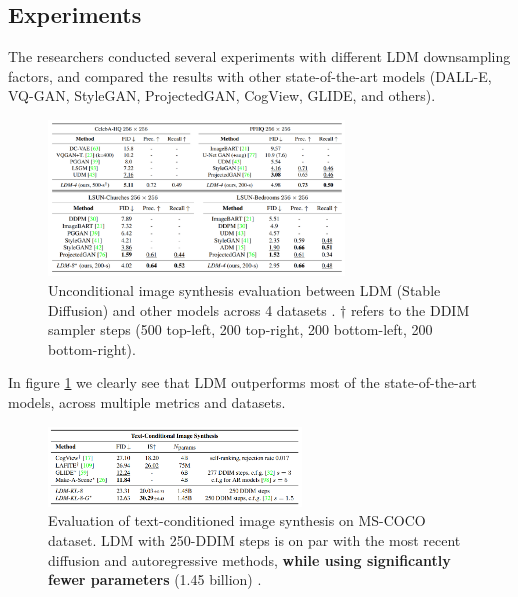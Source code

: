 \subsection{Experiments}

The researchers conducted several experiments with different LDM downsampling factors, and compared the results with other state-of-the-art models (DALL-E, VQ-GAN, StyleGAN, ProjectedGAN, CogView, GLIDE, and others).

\begin{figure}
    \centering
    \includegraphics[width=0.7\textwidth]{images/diffusion_models/stable_diffusion/experiments_1.png}
    \caption{Unconditional image synthesis evaluation between LDM (Stable Diffusion) and other models across 4 datasets \cite{stable_diffusion}. $\dagger$ refers to the DDIM sampler steps (500 top-left, 200 top-right, 200 bottom-left, 200 bottom-right).}
    \label{fig:stable_diffusion_experiments_unconditional}
\end{figure}

In figure \ref{fig:stable_diffusion_experiments_unconditional} we clearly see that LDM outperforms most of the state-of-the-art models, across multiple metrics and datasets.

\begin{figure}
    \centering
    \includegraphics[width=0.6\textwidth]{images/diffusion_models/stable_diffusion/experiments_2.png}
    \caption{Evaluation of text-conditioned image synthesis on MS-COCO dataset. LDM with 250-DDIM steps is on par with the most recent diffusion and autoregressive methods, \textbf{while using significantly fewer parameters} (1.45 billion) \cite{stable_diffusion}.}
    \label{fig:stable_diffusion_mscoco}
\end{figure}

